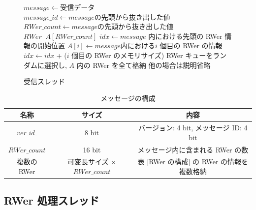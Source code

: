 \renewcommand{\algorithmicrequire}{\textbf{Input:}}
\renewcommand{\algorithmicensure}{\textbf{Output:}}
\begin{figure}[!t]
    \begin{algorithm}[H]
        \caption{受信スレッド}
        \label{受信スレッド}
        \begin{algorithmic}[1]    
        \STATE $message \leftarrow 受信データ$
        \STATE $message\_id \leftarrow message の先頭から抜き出した値$
        \STATE $RWer\_count \leftarrow message の先頭から抜き出した値$
        \STATE $RWer \;\; A[RWer\_count]$
        \STATE $idx \leftarrow message$ 内における先頭の RWer 情報の開始位置
        \STATE $A[i] \leftarrow message 内における i$ 個目の RWer の情報
        \STATE $idx \leftarrow idx$ + ($i$ 個目の RWer のメモリサイズ)
        \ENDFOR
        \STATE RWer キューをランダムに選択し, $A$ 内の RWer を全て格納
        \ELSE
        \STATE 他の場合は説明省略
        \ENDIF
        \end{algorithmic}
    \end{algorithm}
\end{figure}

\begin{table}[t]
    \caption{メッセージの構成}
    \label{メッセージの構成}
    \centering
    \begin{tabular}{ccc}
        \hline
        名称  &  サイズ  &  内容 \\
        \hline \hline
        $ver\_id\_$  &  8 bit  &  バージョン: 4 bit, メッセージ ID: 4 bit \\
        \hline
        $RWer\_count$  &  16 bit  &  メッセージ内に含まれる RWer の数 \\
        \hline
        複数の RWer  &  可変長サイズ $\times$ $RWer\_count$  &  表 \ref{RWer の構成} の RWer の情報を複数格納 \\
        \hline
    \end{tabular}
\end{table}

\subsection{RWer 処理スレッド}

